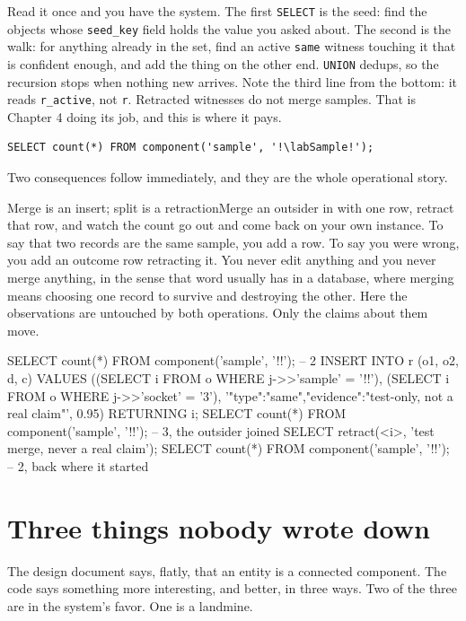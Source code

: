 Read it once and you have the system. The first \texttt{SELECT} is the seed: find the objects whose \texttt{seed\_key} field holds the value you asked about. The second is the walk: for anything already in the set, find an active \texttt{same} witness touching it that is confident enough, and add the thing on the other end. \texttt{UNION} dedups, so the recursion stops when nothing new arrives. Note the third line from the bottom: it reads \texttt{r\_active}, not \texttt{r}. Retracted witnesses do not merge samples. That is Chapter 4 doing its job, and this is where it pays.

\begin{lstlisting}
SELECT count(*) FROM component('sample', '!\labSample!');
\end{lstlisting}

Two consequences follow immediately, and they are the whole operational story.

\begin{Correspondence}{Merge is an insert; split is a retraction}{Merge an outsider in with one row, retract that row, and watch the count go out and come back on your own instance.}
To say that two records are the same sample, you add a row. To say you were wrong, you add an outcome row retracting it. You never edit anything and you never merge anything, in the sense that word usually has in a database, where merging means choosing one record to survive and destroying the other. Here the observations are untouched by both operations. Only the claims about them move.
\begin{Check}
SELECT count(*) FROM component('sample', '!\labSample!');   -- 2
INSERT INTO r (o1, o2, d, c) VALUES
  ((SELECT i FROM o WHERE j->>'sample' = '!\labSample!'),
   (SELECT i FROM o WHERE j->>'socket' = '3'),
   '{"type":"same","evidence":"test-only, not a real claim"}', 0.95)
RETURNING i;
SELECT count(*) FROM component('sample', '!\labSample!');   -- 3, the outsider joined
SELECT retract(<i>, 'test merge, never a real claim');
SELECT count(*) FROM component('sample', '!\labSample!');   -- 2, back where it started
\end{Check}
\end{Correspondence}

\section{Three things nobody wrote down}

The design document says, flatly, that an entity is a connected component. The code says something more interesting, and better, in three ways. Two of the three are in the system's favor. One is a landmine.

